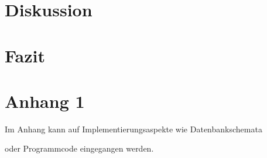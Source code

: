 \documentclass[pdftex,12pt,a4paper]{report}
\begin{document}

\chapter{Diskussion}
\label{chp:diskussion}



\chapter{Fazit}
\label{chp:fazit}




\appendix


\chapter{Anhang 1}

Im Anhang kann auf Implementierungsaspekte wie Datenbankschemata

oder Programmcode eingegangen werden.



\listoffigures



\listoftables



    



\end{document}
